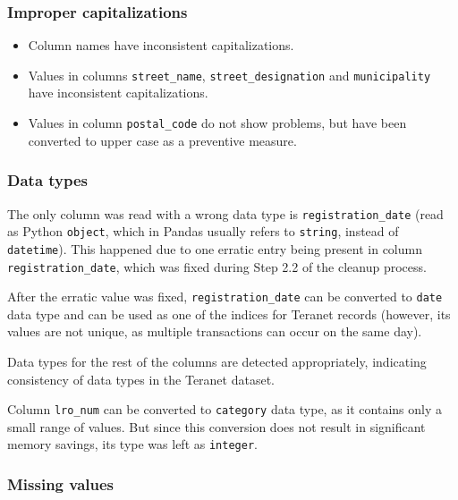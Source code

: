 \documentclass[11pt]{article}
\begin{document}
    \subsubsection{Improper capitalizations} \label{subsubsec:teranet_capitalizations}

    \begin{itemize}
        \item Column names have inconsistent capitalizations.
        \item Values in columns \texttt{street\_name}, \texttt{street\_designation} and \texttt{municipality} have inconsistent capitalizations.
        \item Values in column \texttt{postal\_code} do not show problems, but have been converted to upper case as a preventive measure.
    \end{itemize}

    \subsubsection{Data types} \label{subsubsec:teranet_data_types}

    The only column was read with a wrong data type is \texttt{registration\_date} (read as Python \texttt{object}, which in Pandas usually refers to \texttt{string}, instead of \texttt{datetime}).
    This happened due to one erratic entry being present in column \texttt{registration\_date}, which was fixed during Step 2.2 of the cleanup process.

    After the erratic value was fixed, \texttt{registration\_date} can be converted to \texttt{date} data type and can be used as one of the indices for Teranet records (however, its values are not unique, as multiple transactions can occur on the same day).

    Data types for the rest of the columns are detected appropriately, indicating consistency of data types in the Teranet dataset.

    Column \texttt{lro\_num} can be converted to \texttt{category} data type, as it contains only a small range of values.
    But since this conversion does not result in significant memory savings, its type was left as \texttt{integer}.

    \subsubsection{Missing values} \label{subsubsec:teranet_missing_values}
\end{document}
